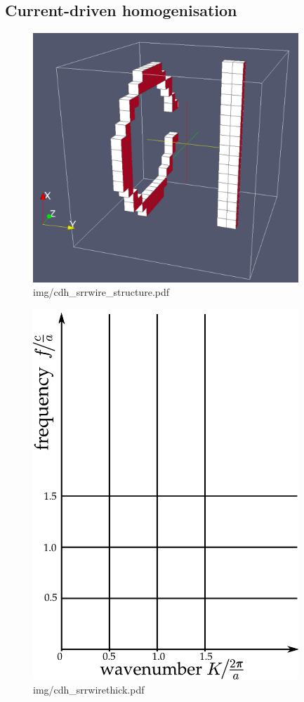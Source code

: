 \subsection{Current-driven homogenisation} %
\begin{figure} \caption{img/cdh\_srrwire\_structure.pdf}  \centering \includegraphics[width=10cm]{img/cdh_srrwire_structure.pdf} \end{figure} \clearpage
\begin{figure} \caption{img/cdh\_srrwirethick.pdf}  \centering \includegraphics[width=10cm]{img/cdh_srrwirethick.pdf} \end{figure} \clearpage

